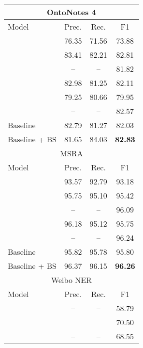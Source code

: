 \documentclass[11pt]{article}
\begin{document}
\begin{table}[!ht]
    \centering \small
    \begin{tabular}{lccc}
        \toprule
        \multicolumn{4}{c}{OntoNotes 4} \\
        \midrule
        Model & Prec. & Rec. & F1 \\
        \midrule
        \citet{zhang-yang-2018-chinese} & 76.35 & 71.56 & 73.88 \\
        \citet{ma-etal-2020-simplify}   & 83.41 & 82.21 & 82.81 \\
        \citet{li-etal-2020-flat}       & -- & -- & 81.82 \\
        \citet{li-etal-2020-unified}    & 82.98 & 81.25 & 82.11 \\
        \citet{chen-kong-2021-enhancing} & 79.25 & 80.66 & 79.95 \\
        \citet{wu-etal-2021-mect}       & -- & -- & 82.57 \\
        Baseline          & 82.79 & 81.27 & 82.03 \\
        Baseline + BS     & 81.65 & 84.03 & \textbf{82.83} \\
        \bottomrule
        \toprule
        \multicolumn{4}{c}{MSRA} \\
        \midrule
        Model & Prec. & Rec. & F1 \\
        \midrule
        \citet{zhang-yang-2018-chinese} & 93.57 & 92.79 & 93.18 \\
        \citet{ma-etal-2020-simplify}   & 95.75 & 95.10 & 95.42 \\
        \citet{li-etal-2020-flat}       & -- & -- & 96.09 \\
        \citet{li-etal-2020-unified}    & 96.18 & 95.12 & 95.75 \\
        \citet{wu-etal-2021-mect}       & -- & -- & 96.24 \\
        Baseline          & 95.82 & 95.78 & 95.80 \\
        Baseline + BS     & 96.37 & 96.15 & \textbf{96.26} \\
        \bottomrule
        \toprule
        \multicolumn{4}{c}{Weibo NER} \\
        \midrule
        Model & Prec. & Rec. & F1 \\
        \midrule
        \citet{zhang-yang-2018-chinese} & -- & -- & 58.79 \\
        \citet{ma-etal-2020-simplify}   & -- & -- & 70.50 \\
        \citet{li-etal-2020-flat}       & -- & -- & 68.55 \\

\end{tabular}
\end{table}
\end{document}
